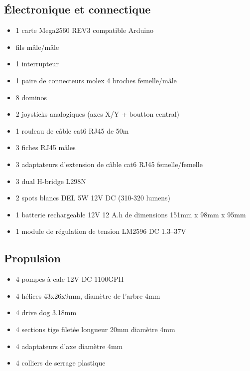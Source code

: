 \documentclass[11pt,a4paper]{article}
\begin{document}
    \subsection{Électronique et connectique}
      \begin{itemize}
        \setlength\itemsep{-2mm}
        \item 1 carte Mega2560 REV3 compatible Arduino \cite{arduino}
        \item fils mâle/mâle \cite{filsMM}
        \item 1 interrupteur
        \item 1 paire de connecteurs molex 4 broches femelle/mâle
        \item 8 dominos
        \item 2 joysticks analogiques (axes X/Y + boutton central) \cite{joystick}
        \item 1 rouleau de câble cat6 RJ45 de 50m
        \item 3 fiches RJ45 mâles
        \item 3 adaptateurs d'extension de câble cat6 RJ45 femelle/femelle
        \item 3 dual H-bridge L298N \cite{dualHBridge} %
        \item 2 spots blancs DEL 5W 12V DC (310-320 lumens) \cite{lampe}
        \item 1 batterie rechargeable 12V 12 A.h de dimensions 151mm x 98mm x 95mm %
        \item 1 module de régulation de tension LM2596 DC 1.3--37V \cite{regulateurTension}%
      \end{itemize}

    \subsection{Propulsion}
      \begin{itemize}
        \setlength\itemsep{-2mm}
        \item 4 pompes à cale 12V DC 1100GPH \cite{pompe}
        \item 4 hélices 43x26x9mm, diamètre de l'arbre 4mm \cite{helice}
        \item 4 drive dog 3.18mm \cite{driveDog}
        \item 4 sections tige filetée longueur 20mm diamètre 4mm %
        \item 4 adaptateurs d'axe diamètre 4mm \cite{adaptateurAxe}
        \item 4 colliers de serrage plastique
      \end{itemize}
      
\end{document}

